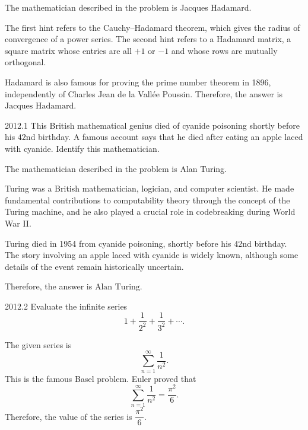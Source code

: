     \begin{solution}
        The mathematician described in the problem is Jacques Hadamard.

        The first hint refers to the Cauchy--Hadamard theorem, which gives the radius of convergence
        of a power series. The second hint refers to a Hadamard matrix, a square matrix whose
        entries are all $+1$ or $-1$ and whose rows are mutually orthogonal.

        Hadamard is also famous for proving the prime number theorem in 1896, independently of
        Charles Jean de la Vallée Poussin. Therefore, the answer is $\boxed{\text{Jacques
        Hadamard}}$.
    \end{solution}

    \begin{pastproblem}{2012.1}
        This British mathematical genius died of cyanide poisoning shortly before his $42$nd
        birthday. A famous account says that he died after eating an apple laced with cyanide.
        Identify this mathematician.
    \end{pastproblem}

    \begin{solution}
        The mathematician described in the problem is Alan Turing.

        Turing was a British mathematician, logician, and computer scientist. He made fundamental
        contributions to computability theory through the concept of the Turing machine, and he also
        played a crucial role in codebreaking during World War II.

        Turing died in 1954 from cyanide poisoning, shortly before his $42$nd birthday. The story
        involving an apple laced with cyanide is widely known, although some details of the event
        remain historically uncertain.

        Therefore, the answer is $\boxed{\text{Alan Turing}}$.
    \end{solution}

    \begin{pastproblem}{2012.2}
        Evaluate the infinite series
        \[
            1+\frac{1}{2^2}+\frac{1}{3^2}+\cdots.
        \]
    \end{pastproblem}

    \begin{solution}
        The given series is
        \[
            \sum_{n=1}^{\infty}\frac{1}{n^2}.
        \]
        This is the famous Basel problem. Euler proved that
        \[
            \sum_{n=1}^{\infty}\frac{1}{n^2}
            =
            \frac{\pi^2}{6}.
        \]
        Therefore, the value of the series is $\boxed{\dfrac{\pi^2}{6}}$.
    \end{solution}

